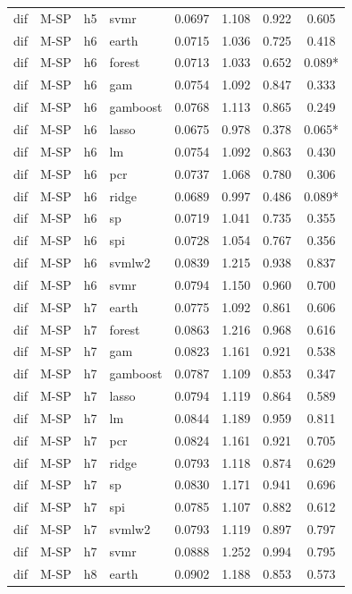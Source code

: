 \begin{ThreePartTable}
\begin{longtable}[t]{llclcccc}
dif & M-SP & h5 & svmr & 0.0697 & 1.108 & 0.922 & 0.605\\
\addlinespace
dif & M-SP & h6 & earth & 0.0715 & 1.036 & 0.725 & 0.418\\
dif & M-SP & h6 & forest & 0.0713 & 1.033 & 0.652 & 0.089*\\
dif & M-SP & h6 & gam & 0.0754 & 1.092 & 0.847 & 0.333\\
dif & M-SP & h6 & gamboost & 0.0768 & 1.113 & 0.865 & 0.249\\
dif & M-SP & h6 & lasso & 0.0675 & 0.978 & 0.378 & 0.065*\\
dif & M-SP & h6 & lm & 0.0754 & 1.092 & 0.863 & 0.430\\
dif & M-SP & h6 & pcr & 0.0737 & 1.068 & 0.780 & 0.306\\
dif & M-SP & h6 & ridge & 0.0689 & 0.997 & 0.486 & 0.089*\\
dif & M-SP & h6 & sp & 0.0719 & 1.041 & 0.735 & 0.355\\
dif & M-SP & h6 & spi & 0.0728 & 1.054 & 0.767 & 0.356\\
dif & M-SP & h6 & svmlw2 & 0.0839 & 1.215 & 0.938 & 0.837\\
dif & M-SP & h6 & svmr & 0.0794 & 1.150 & 0.960 & 0.700\\
\addlinespace
dif & M-SP & h7 & earth & 0.0775 & 1.092 & 0.861 & 0.606\\
dif & M-SP & h7 & forest & 0.0863 & 1.216 & 0.968 & 0.616\\
dif & M-SP & h7 & gam & 0.0823 & 1.161 & 0.921 & 0.538\\
dif & M-SP & h7 & gamboost & 0.0787 & 1.109 & 0.853 & 0.347\\
dif & M-SP & h7 & lasso & 0.0794 & 1.119 & 0.864 & 0.589\\
dif & M-SP & h7 & lm & 0.0844 & 1.189 & 0.959 & 0.811\\
dif & M-SP & h7 & pcr & 0.0824 & 1.161 & 0.921 & 0.705\\
dif & M-SP & h7 & ridge & 0.0793 & 1.118 & 0.874 & 0.629\\
dif & M-SP & h7 & sp & 0.0830 & 1.171 & 0.941 & 0.696\\
dif & M-SP & h7 & spi & 0.0785 & 1.107 & 0.882 & 0.612\\
dif & M-SP & h7 & svmlw2 & 0.0793 & 1.119 & 0.897 & 0.797\\
dif & M-SP & h7 & svmr & 0.0888 & 1.252 & 0.994 & 0.795\\
\addlinespace
dif & M-SP & h8 & earth & 0.0902 & 1.188 & 0.853 & 0.573\\

\end{longtable}
\end{ThreePartTable}
